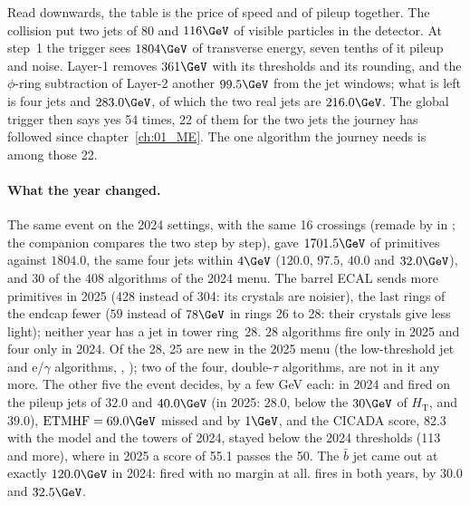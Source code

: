 Read downwards, the table is the price of speed and of pileup together. The collision put two jets of $80$ and
$116\GeV$ of visible particles in the detector. At step~1 the trigger sees $1804\GeV$ of transverse energy, seven
tenths of it pileup and noise. Layer-1 removes $361\GeV$ with its thresholds and its rounding, and the $\phi$-ring subtraction of
Layer-2 another $99.5\GeV$ from the jet windows; what is left is four jets and $283.0\GeV$, of which the two real jets
are $216.0\GeV$. The global trigger then says yes 54 times, 22 of them for the two jets the journey has followed
since chapter~\ref{ch:01_ME}. The one algorithm the journey needs is among those 22.

\paragraph{What the year changed.} The same event on the 2024 settings, with the same 16 crossings (remade by
 in ; the companion compares the two step by step), gave
$1701.5\GeV$ of primitives against $1804.0$, the same four jets within $4\GeV$ ($120.0$, $97.5$, $40.0$ and $32.0\GeV$),
and 30 of the 408 algorithms of the 2024 menu. The barrel ECAL sends more primitives in 2025 (428 instead of 304:
its crystals are noisier), the last rings of the endcap fewer ($59$ instead of $78\GeV$ in rings 26 to 28: their
crystals give less light); neither year has a jet in tower ring~28. 28 algorithms fire only in 2025 and four only
in 2024. Of the 28, 25 are new in the 2025 menu (the low-threshold jet and e/$\gamma$ algorithms,
, ); two of the four, double-$\tau$ algorithms, are not in it
any more. The other five the event decides, by a few GeV each: in 2024  and  fired
on the pileup jets of $32.0$ and $40.0\GeV$ (in 2025: $28.0$, below the $30\GeV$ of $H_{\mathrm T}$, and $39.0$),
$\mathrm{ETMHF}=69.0\GeV$ missed  and  by $1\GeV$, and the CICADA score,
82.3 with the model and the towers of 2024, stayed below the 2024 thresholds (113 and more), where in 2025 a score of
55.1 passes the  50. The $\bar b$ jet came out at exactly $120.0\GeV$ in 2024: 
fired with no margin at all.  fires in both years, by $30.0$ and $32.5\GeV$.

